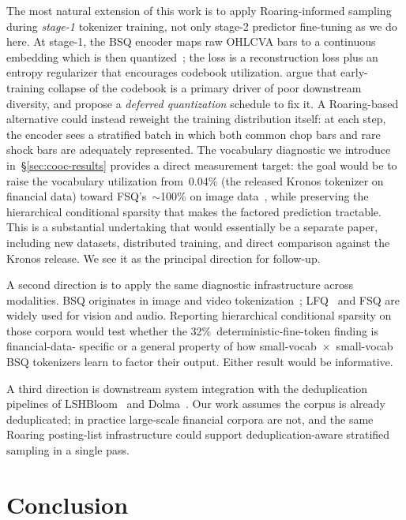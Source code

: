 \documentclass[10pt]{article}
\begin{document}
The most natural extension of this work is to apply Roaring-informed
sampling during \emph{stage-1} tokenizer training, not only stage-2
predictor fine-tuning as we do here. At stage-1, the BSQ encoder maps
raw OHLCVA bars to a continuous embedding which is then
quantized~\citep{bsq2024}; the loss is a reconstruction loss plus an
entropy regularizer that encourages codebook
utilization. \citet{shrinks_codebook2026} argue that early-training
collapse of the codebook is a primary driver of poor downstream
diversity, and propose a \emph{deferred quantization} schedule to fix
it. A Roaring-based alternative could instead reweight the training
distribution itself: at each step, the encoder sees a stratified
batch in which both common chop bars and rare shock bars are
adequately represented. The vocabulary diagnostic we introduce
in~\S\ref{sec:cooc-results} provides a direct measurement target:
the goal would be to raise the vocabulary utilization
from~0.04\% (the released Kronos tokenizer on financial data)
toward FSQ's~\mbox{$\sim$100\%} on image data~\citep{fsq2024}, while
preserving the hierarchical conditional sparsity that makes the
factored prediction tractable. This is a substantial undertaking
that would essentially be a separate paper, including new datasets,
distributed training, and direct comparison against the Kronos
release. We see it as the principal direction for follow-up.

A second direction is to apply the same diagnostic infrastructure
across modalities. BSQ originates in image and video
tokenization~\citep{bsq2024}; LFQ~\citep{lfq2024} and FSQ
\citep{fsq2024} are widely used for vision and audio. Reporting
hierarchical conditional sparsity on those corpora would test
whether the 32\%~deterministic-fine-token finding is financial-data-
specific or a general property of how
small-vocab~$\times$~small-vocab BSQ tokenizers learn to factor
their output. Either result would be informative.

A third direction is downstream system integration with the
deduplication pipelines of LSHBloom~\citep{lshbloom2024} and
Dolma~\citep{dolma2024}. Our work assumes the corpus is already
deduplicated; in practice large-scale financial corpora are not, and
the same Roaring posting-list infrastructure could support
deduplication-aware stratified sampling in a single pass.

\section{Conclusion}
\end{document}
